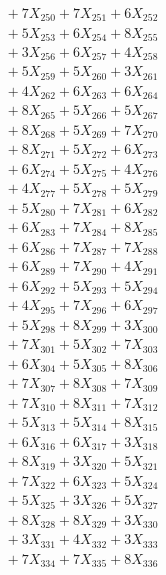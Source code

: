 \documentclass[a4paper,10pt]{article}
\begin{document}
{\begin{align}
&\;  + 7 X_{250} + 7 X_{251} + 6 X_{252} \\[0.3ex]
&\;  + 5 X_{253} + 6 X_{254} + 8 X_{255} \\[0.3ex]
&\;  + 3 X_{256} + 6 X_{257} + 4 X_{258} \\[0.3ex]
&\;  + 5 X_{259} + 5 X_{260} + 3 X_{261} \\[0.3ex]
&\;  + 4 X_{262} + 6 X_{263} + 6 X_{264} \\[0.3ex]
&\;  + 8 X_{265} + 5 X_{266} + 5 X_{267} \\[0.3ex]
&\;  + 8 X_{268} + 5 X_{269} + 7 X_{270} \\[0.3ex]
&\;  + 8 X_{271} + 5 X_{272} + 6 X_{273} \\[0.3ex]
&\;  + 6 X_{274} + 5 X_{275} + 4 X_{276} \\[0.3ex]
&\;  + 4 X_{277} + 5 X_{278} + 5 X_{279} \\[0.5ex]\allowbreak
&\;  + 5 X_{280} + 7 X_{281} + 6 X_{282} \\[0.3ex]
&\;  + 6 X_{283} + 7 X_{284} + 8 X_{285} \\[0.3ex]
&\;  + 6 X_{286} + 7 X_{287} + 7 X_{288} \\[0.3ex]
&\;  + 6 X_{289} + 7 X_{290} + 4 X_{291} \\[0.3ex]
&\;  + 6 X_{292} + 5 X_{293} + 5 X_{294} \\[0.3ex]
&\;  + 4 X_{295} + 7 X_{296} + 6 X_{297} \\[0.3ex]
&\;  + 5 X_{298} + 8 X_{299} + 3 X_{300} \\[0.3ex]
&\;  + 7 X_{301} + 5 X_{302} + 7 X_{303} \\[0.3ex]
&\;  + 6 X_{304} + 5 X_{305} + 8 X_{306} \\[0.3ex]
&\;  + 7 X_{307} + 8 X_{308} + 7 X_{309} \\[0.5ex]\allowbreak
&\;  + 7 X_{310} + 8 X_{311} + 7 X_{312} \\[0.3ex]
&\;  + 5 X_{313} + 5 X_{314} + 8 X_{315} \\[0.3ex]
&\;  + 6 X_{316} + 6 X_{317} + 3 X_{318} \\[0.3ex]
&\;  + 8 X_{319} + 3 X_{320} + 5 X_{321} \\[0.3ex]
&\;  + 7 X_{322} + 6 X_{323} + 5 X_{324} \\[0.3ex]
&\;  + 5 X_{325} + 3 X_{326} + 5 X_{327} \\[0.3ex]
&\;  + 8 X_{328} + 8 X_{329} + 3 X_{330} \\[0.3ex]
&\;  + 3 X_{331} + 4 X_{332} + 3 X_{333} \\[0.3ex]
&\;  + 7 X_{334} + 7 X_{335} + 8 X_{336} \\[0.3ex]

\end{align}}
\end{document}
